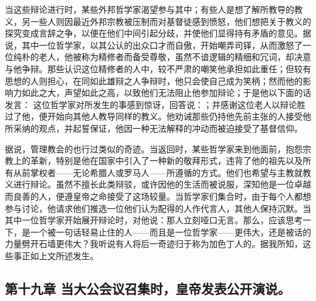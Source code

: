 当这些辩论进行时，某些外邦哲学家渴望参与其中；有些人是想了解所教导的教义，另一些人则因最近外邦宗教被压制而对基督徒感到愤怒，他们想把关于教义的探究变成言辞之争，以便在他们中间引起分歧，并使他们显得持有矛盾的意见。据说，其中一位哲学家，以其公认的出众口才而自傲，开始嘲弄司铎，从而激怒了一位纯朴的老人，他被称为精修者而备受尊敬，虽然不谙逻辑的精细和冗词，却决意与他争辩。那些认识这位精修者的人中，较不严肃的嘲笑他承担如此重任；但较有思想的人则担心，在同如此雄辩之人争辩时，他只会使自己成为笑柄；然而他的影响力如此之大，声望如此之高，以致他们无法阻止他参加辩论；于是他以下面的话发言： 这位哲学家对所发生的事感到惊讶，回答说：；并感谢这位老人以辩论胜过了他，便开始向其他人教导同样的教义。他劝诫那些仍持他先前主张的人接受他所采纳的观点，并起誓保证，他因一种无法解释的冲动而被迫接受了基督信仰。\par

据说，管理教会的也行过类似的奇迹。当返回时，某些哲学家来到他面前，抱怨宗教上的革新，特别是他在国家中引入了一种新的敬拜形式，违背了他的祖先以及所有从前掌权者——无论希腊人或罗马人——所遵循的方式。他们也希望与主教就教义进行辩论。虽然不擅长此类辩驳，或许因他的生活而被说服，深知他是一位卓越而良善的人，便遵皇帝之命接受了这场较量。当哲学家们集合时，由于每个人都想参与讨论，他请求他们推选一位他们认为配得的人作代言人，其他人保持沉默。当其中一位哲学家开始展开辩论时，对他说：那人立刻哑口无言。那么，应该思考一下，是一个被一句话轻易止住的人——而且是一位哲学家——更伟大，还是被话的力量劈开石墙更伟大？我听说有人将后一奇迹归于称为加色丁人的。据我所知，这些事正如上文所述发生。\par


\subsection{第十九章  当大公会议召集时，皇帝发表公开演说。}

